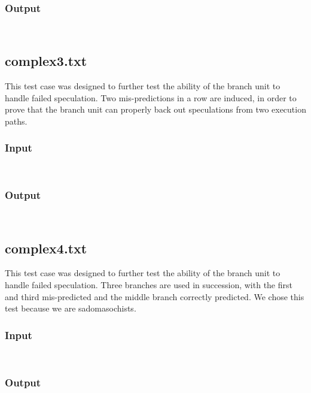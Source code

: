 \documentclass[12pt]{article}
\begin{document}
\subsubsection*{Output}
\begin{verbatim}
    
\end{verbatim}

\subsection{complex3.txt}
This test case was designed to further test the ability of the branch unit to handle failed speculation.  Two mis-predictions in a row are induced, in order to prove that the branch unit can properly back out speculations from two execution paths.

\subsubsection*{Input}
\begin{verbatim}
    
\end{verbatim}

\subsubsection*{Output}
\begin{verbatim}
    
\end{verbatim}

\subsection{complex4.txt}
This test case was designed to further test the ability of the branch unit to handle failed speculation.  Three branches are used in succession, with the first and third mis-predicted and the middle branch correctly predicted.  We chose this test because we are sadomasochists.

\subsubsection*{Input}
\begin{verbatim}
    
\end{verbatim}

\subsubsection*{Output}
\begin{verbatim}
    
\end{verbatim}
\end{document}
